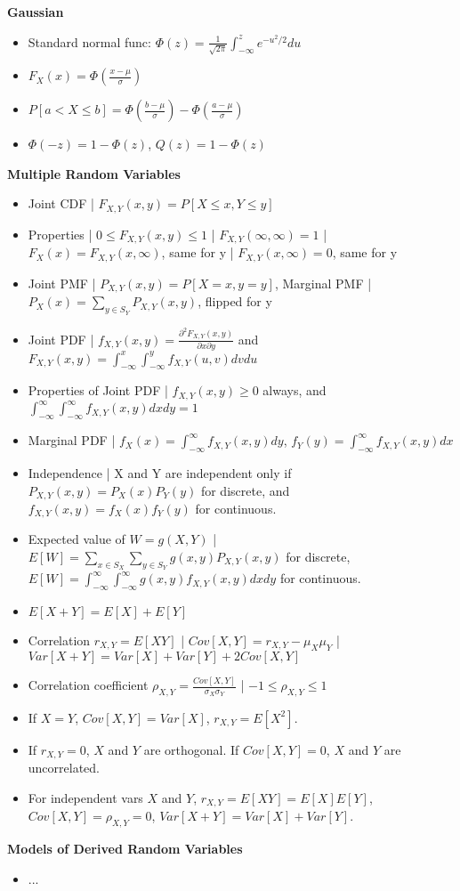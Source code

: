 \documentclass[8pt]{article}
\begin{document}
\textbf{Gaussian}
\begin{itemize}
    \item Standard normal func: $\Phi(z) = \frac{1}{\sqrt{2 \pi}} \int_{-\infty}^z e^{-u^2/2} du$
    \item $F_X(x) = \Phi\left(\frac{x - \mu}{\sigma}\right)$
    \item $P[a < X \leq b] = \Phi\left(\frac{b - \mu}{\sigma}\right) - \Phi\left(\frac{a - \mu}{\sigma}\right)$
    \item $\Phi(-z) = 1 - \Phi(z)$, $Q(z) = 1 - \Phi(z)$
\end{itemize}
\textbf{Multiple Random Variables}
\begin{itemize}
    \item Joint CDF | $F_{X,Y}(x,y) = P[X \leq x, Y \leq y]$
    \item Properties | $0 \leq F_{X,Y}(x, y) \leq 1$ | $F_{X,Y}(\infty, \infty) = 1$ | $F_X(x) = F_{X,Y}(x, \infty)$, same for y | $F_{X,Y}(x, \infty) = 0$, same for y
    \item Joint PMF | $P_{X,Y}(x, y) = P[X = x, y = y]$, Marginal PMF | $P_X(x) = \sum_{y \in S_Y} P_{X,Y}(x, y)$, flipped for y
    \item Joint PDF | $f_{X,Y}(x, y) = \frac{\partial^2 F_{X,Y}(x, y)}{\partial x \partial y}$ and $F_{X,Y}(x, y) = \int_{-\infty}^x \int_{-\infty}^y f_{X,Y}(u, v) dv du$
    \item Properties of Joint PDF | $f_{X,Y}(x, y) \geq 0$ always, and $\int_{-\infty}^\infty \int_{-\infty}^\infty f_{X,Y}(x, y) dxdy = 1$
    \item Marginal PDF | $f_X(x) = \int_{-\infty}^\infty f_{X,Y}(x, y)dy$, $f_Y(y) = \int_{-\infty}^\infty f_{X,Y}(x, y)dx$
    \item Independence | X and Y are independent only if $P_{X,Y}(x, y) = P_X(x) P_Y(y)$ for discrete, and $f_{X,Y}(x, y) = f_X(x)f_Y(y)$ for continuous.
    \item Expected value of $W = g(X, Y)$ | $E[W]= \sum_{x \in S_X} \sum_{y \in S_Y} g(x, y) P_{X,Y}(x, y)$ for discrete, $E[W] = \int_{-\infty}^\infty \int_{-\infty}^\infty g(x, y)f_{X,Y}(x, y)dxdy$ for continuous.
    \item $E[X + Y] = E[X] + E[Y]$
    \item Correlation $r_{X,Y} = E[XY]$ | $Cov[X, Y] = r_{X,Y} - \mu_X \mu_Y$ | $Var[X + Y] = Var[X] + Var[Y] + 2Cov[X, Y]$
    \item Correlation coefficient $\rho_{X,Y} = \frac{Cov[X, Y]}{\sigma_X \sigma_Y}$ | $-1 \leq \rho_{X,Y} \leq 1$
    \item If $X = Y$, $Cov[X, Y] = Var[X]$, $r_{X,Y} = E[X^2]$.
    \item If $r_{X,Y} = 0$, $X$ and $Y$ are orthogonal. If $Cov[X, Y] = 0$, $X$ and $Y$ are uncorrelated.
    \item For independent vars $X$ and $Y$, $r_{X,Y} = E[XY] = E[X]E[Y]$, $Cov[X, Y] = \rho_{X,Y} = 0$, $Var[X + Y] = Var[X] + Var[Y]$.
\end{itemize}
\textbf{Models of Derived Random Variables}
\begin{itemize}
    \item ...
\end{itemize}
\end{document}
